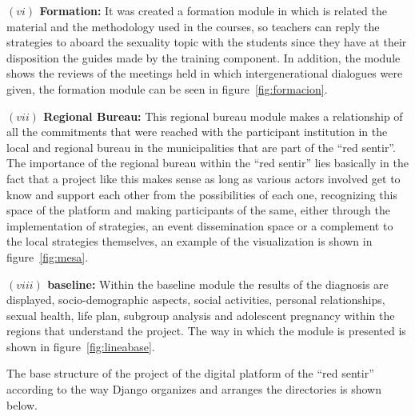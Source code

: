 \documentclass[journal,transmag]{IEEEtran}
\begin{document}
\textbf{$(vi)$ Formation:} It was created a formation module in which is related the material and the methodology used in the courses, so teachers can reply the strategies to aboard the sexuality topic with the students since they have at their disposition the guides made by the training component. In addition, the module shows the reviews of the meetings held in which intergenerational dialogues were given, the formation module can be seen in figure~\ref{fig:formacion}.

\textbf{$(vii)$ Regional Bureau:} This regional bureau module makes a relationship of all the commitments that were reached with the participant institution in the local and regional bureau in the municipalities that are part of the ``red sentir''. The importance of the regional bureau within the ``red sentir'' lies basically in the fact that a project like this makes sense as long as various actors involved get to know and support each other from the possibilities of each one, recognizing this space of the platform and making participants of the same, either through the implementation of strategies, an event dissemination space or a complement to the local strategies themselves, an example of the visualization is shown in figure~\ref{fig:mesa}.

\textbf{$(viii)$ baseline:} Within the baseline module the results of the diagnosis are displayed, socio-demographic aspects, social activities, personal relationships, sexual health, life plan, subgroup analysis and adolescent pregnancy within the regions that understand the project. The way in which the module is presented is shown in figure~\ref{fig:lineabase}.



The base structure of the  project of the digital platform of the ``red sentir'' according to the way Django organizes and arranges the directories is shown below.
\end{document}
